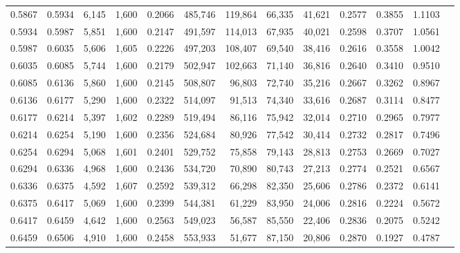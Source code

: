 \begin{tabular}{rrrrrrrrrrrrr}
0.5867 & 0.5934 &  6,145 & 1,600 &                                     0.2066 & 485,746 & 119,864 &  66,335 &  41,621 & 0.2577 & 0.3855 & 1.1103 \\
0.5934 & 0.5987 &  5,851 & 1,600 &                                     0.2147 & 491,597 & 114,013 &  67,935 &  40,021 & 0.2598 & 0.3707 & 1.0561 \\
0.5987 & 0.6035 &  5,606 & 1,605 &                                     0.2226 & 497,203 & 108,407 &  69,540 &  38,416 & 0.2616 & 0.3558 & 1.0042 \\
0.6035 & 0.6085 &  5,744 & 1,600 &                                     0.2179 & 502,947 & 102,663 &  71,140 &  36,816 & 0.2640 & 0.3410 & 0.9510 \\
0.6085 & 0.6136 &  5,860 & 1,600 &                                     0.2145 & 508,807 &  96,803 &  72,740 &  35,216 & 0.2667 & 0.3262 & 0.8967 \\
0.6136 & 0.6177 &  5,290 & 1,600 &                                     0.2322 & 514,097 &  91,513 &  74,340 &  33,616 & 0.2687 & 0.3114 & 0.8477 \\
0.6177 & 0.6214 &  5,397 & 1,602 &                                     0.2289 & 519,494 &  86,116 &  75,942 &  32,014 & 0.2710 & 0.2965 & 0.7977 \\
0.6214 & 0.6254 &  5,190 & 1,600 &                                     0.2356 & 524,684 &  80,926 &  77,542 &  30,414 & 0.2732 & 0.2817 & 0.7496 \\
0.6254 & 0.6294 &  5,068 & 1,601 &                                     0.2401 & 529,752 &  75,858 &  79,143 &  28,813 & 0.2753 & 0.2669 & 0.7027 \\
0.6294 & 0.6336 &  4,968 & 1,600 &                                     0.2436 & 534,720 &  70,890 &  80,743 &  27,213 & 0.2774 & 0.2521 & 0.6567 \\
0.6336 & 0.6375 &  4,592 & 1,607 &                                     0.2592 & 539,312 &  66,298 &  82,350 &  25,606 & 0.2786 & 0.2372 & 0.6141 \\
0.6375 & 0.6417 &  5,069 & 1,600 &                                     0.2399 & 544,381 &  61,229 &  83,950 &  24,006 & 0.2816 & 0.2224 & 0.5672 \\
0.6417 & 0.6459 &  4,642 & 1,600 &                                     0.2563 & 549,023 &  56,587 &  85,550 &  22,406 & 0.2836 & 0.2075 & 0.5242 \\
0.6459 & 0.6506 &  4,910 & 1,600 &                                     0.2458 & 553,933 &  51,677 &  87,150 &  20,806 & 0.2870 & 0.1927 & 0.4787 \\

\end{tabular}
